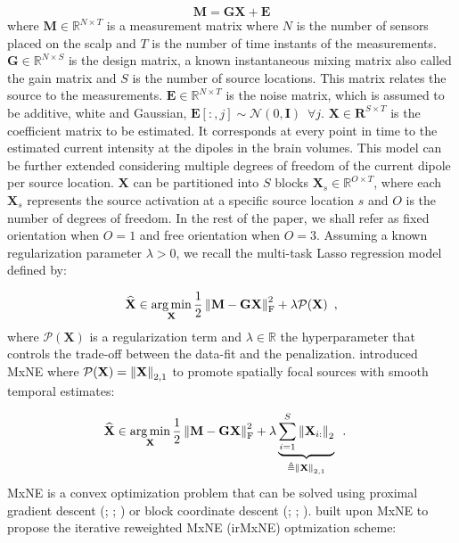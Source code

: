 \begin{equation} \label{eq:1}
    \mathbf{M = GX + E}
\end{equation}
%
where $\mathbf{M} \in \mathbb{R}^{N \times T}$ is a measurement matrix where $N$ is the
number of sensors placed on the scalp and $T$ is the number of time instants of the measurements.
$\mathbf{G} \in \mathbb{R}^{N \times S}$ is the design matrix, a known 
instantaneous mixing matrix also called the gain matrix and $S$ is the number of source locations.
This matrix relates the source
to the measurements. $\mathbf{E} \in \mathbb{R}^{N \times T}$ is the noise matrix, which
is assumed to be additive, white and Gaussian, $\mathbf{E}[:,j] \sim \mathcal{N}(0, \mathbf{I})
\enspace \forall j$. $\mathbf{X} \in \mathbf{R}^{S \times T}$ is the coefficient matrix to be estimated. 
It corresponds at every point in time to the estimated current intensity at the dipoles in
the brain volumes. This model can be further extended considering multiple degrees of freedom of the current dipole
per source location. $\mathbf{X}$ can be partitioned into $S$ blocks $\mathbf{X}_s \in \mathbb{R}^{O \times T}$, where
each $\mathbf{X}_s$ represents the source activation at a specific source location $s$ and $O$ is the number of 
degrees of freedom. In the rest of the paper, we shall refer as fixed orientation when $O = 1$ and
free orientation when $O = 3$. Assuming a known regularization parameter $\lambda > 0$, we recall the multi-task
Lasso regression model defined by:

\begin{equation} \label{eq:2}
    \widehat{\mathbf{X}} \in \operatorname*{arg\,min}_{\mathbf{X}}
    \frac{1}{2}\left \lVert \mathbf{M - GX} \right \rVert^2_{\text{F}}
    + \lambda \mathcal{P}(\mathbf{X})
    \enspace ,
\end{equation}
%
where $\mathcal{P}(\mathbf{X})$ is a regularization term and $\lambda \in \mathbb{R}$ the hyperparameter
that controls the trade-off between the data-fit and the penalization. \cite{Gramfort_Kowalski_Hamalainen12}
introduced MxNE where $\mathcal{P}(\mathbf{X}) = \left \lVert \mathbf{X} \right \rVert_{2, 1}$ to promote spatially focal sources with
smooth temporal estimates:

\begin{align} \label{eq:3}
    \widehat{\mathbf{X}} 
    &\in
    \operatorname*{arg\,min}_{\mathbf{X}}
    \frac{1}{2}\left \lVert \mathbf{M - GX} \right \rVert^2_{\text{F}}
    + \lambda  
    \underbrace{\sum_{i=1}^{S} \left \lVert \mathbf{X}_{i:} \right \rVert_{2}}_{\triangleq \left \lVert \mathbf{X} \right \rVert_{2, 1}}
    \enspace .
\end{align}
%
MxNE is a convex optimization problem that can be solved using proximal gradient descent (\cite{Nesterov05}; \cite{Nesterov09}; \cite{Beck_Teboulle09})
or block coordinate descent (\cite{Tseng_Yun09}; \cite{Wright2015}; \cite{Massias_Vaiter_Gramfort_Salmon20}). \cite{Strohmeier_Bekhti_Haueisen_Gramfort_2016} built upon MxNE to propose the iterative reweighted MxNE (irMxNE) optmization
scheme:

